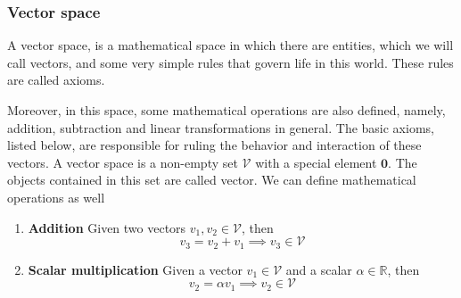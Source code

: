 \subsubsection{Vector space \label{kugel:ssection:vector_space}}
A vector space, is a mathematical space in which there are entities, which we will call vectors, and some very simple rules that govern life in this world. These rules are called axioms.

Moreover, in this space, some mathematical operations are also defined, namely, addition, subtraction and linear transformations in general.\newline
The basic axioms, listed below, are responsible for ruling the behavior and interaction of these vectors.\newline
A vector space is a non-empty set $\mathcal{V}$ with a special element $\mathbf{0}$. The objects contained in this set are called vector.\newline
We can define mathematical operations as well
\begin{enumerate}
    \item \textbf{Addition}\newline
    Given two vectors $v_1, v_2 \in \mathcal{V}$, then  
    \begin{equation*}
        v_3 = v_2 + v_1 \implies v_3 \in \mathcal{V} 
    \end{equation*}

    \item \textbf{Scalar multiplication}\newline
    Given a vector $v_1 \in \mathcal{V}$ and a scalar $\alpha \in \mathbb{R}$, then  
    \begin{equation*}
        v_2 = \alpha v_1 \implies v_2 \in \mathcal{V} 
    \end{equation*}
\end{enumerate}

